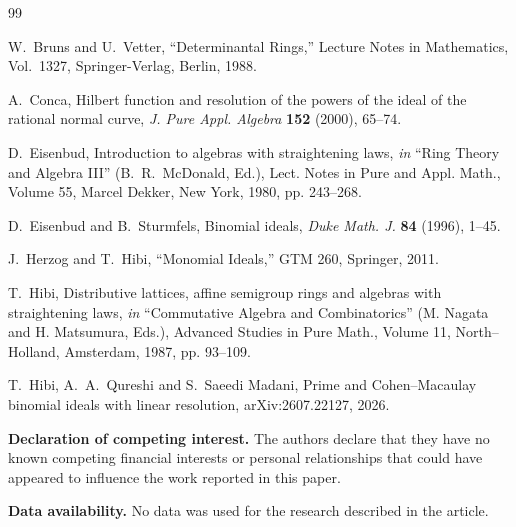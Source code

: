\documentclass[12pt]{amsart}
\begin{document}
\begin{thebibliography}{99}


W.~Bruns and U.~Vetter,
``Determinantal Rings,''
Lecture Notes in Mathematics, Vol.~1327,
Springer-Verlag, Berlin, 1988.



A.~Conca,
Hilbert function and resolution of the powers of the ideal of the
rational normal curve,
\emph{J. Pure Appl. Algebra} \textbf{152} (2000), 65--74.




D.~Eisenbud, Introduction to algebras with straightening laws, {\em in} ``Ring Theory and Algebra III'' (B.~R.~McDonald, Ed.), Lect. Notes in Pure and Appl. Math., Volume 55, Marcel Dekker, New York, 1980, pp. 243--268.



D.~Eisenbud and B.~Sturmfels,
Binomial ideals,
\emph{Duke Math. J.} \textbf{84} (1996), 1--45.



J.~Herzog and T.~Hibi, ``Monomial Ideals,'' GTM 260, Springer, 2011.



T.~Hibi, Distributive lattices, affine semigroup rings and algebras with straightening laws, {\it in} ``Commutative Algebra and Combinatorics'' (M. Nagata and H. Matsumura, Eds.), Advanced Studies in Pure Math., Volume 11, North--Holland, Amsterdam, 1987, pp. 93--109.


T.~Hibi, A.~A.~Qureshi and S.~Saeedi Madani,
Prime and Cohen--Macaulay binomial ideals with linear resolution,
arXiv:2607.22127, 2026.


\end{thebibliography}
\bigskip

\begin{footnotesize}
{\bf Declaration of competing interest.}  The authors declare that they have no known competing financial interests or personal relationships that could have appeared to influence the work reported in this paper.

\medskip

{\bf Data availability.} No data was used for the research described in the article. 

\medskip

\end{footnotesize}
\end{document}
